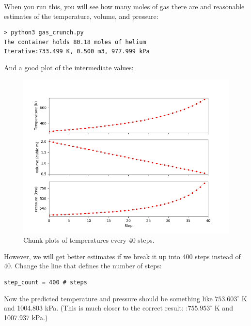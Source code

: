 When you run this, you will see how many moles of gas there are and reasonable estimates of the temperature, volume, and pressure:

\begin{Verbatim}
> python3 gas_crunch.py      
The container holds 80.18 moles of helium
Iterative:733.499 K, 0.500 m3, 977.999 kPa
\end{Verbatim}

And a good plot of the intermediate values:
\begin{figure}[htbp]
    \centering
    \includegraphics[width=\textwidth]{chunkplot1.png}
    \caption{Chunk plots of temperatures every 40 steps.}
    \label{fig:chunkplot1}
\end{figure}

However, we will get better estimates if we break it up into 400 steps instead of 40. Change the line that defines the number of steps:

\begin{Verbatim}
step_count = 400 # steps
\end{Verbatim}

Now the predicted temperature and pressure should be something like $753.603^\circ$ K and 1004.803 kPa.  (This is much closer to the correct result: :$755.953^\circ$ K and 1007.937 kPa.)

